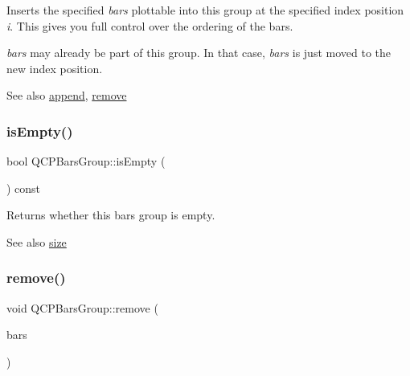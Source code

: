 Inserts the specified {\itshape bars} plottable into this group at the specified index position {\itshape i}. This gives you full control over the ordering of the bars.

{\itshape bars} may already be part of this group. In that case, {\itshape bars} is just moved to the new index position.

\begin{DoxySeeAlso}{See also}
\mbox{\hyperlink{class_q_c_p_bars_group_a809ed63cc4ff7cd5b0b8c96b470163d3}{append}}, \mbox{\hyperlink{class_q_c_p_bars_group_a215e28a5944f1159013a0e19169220e7}{remove}} 
\end{DoxySeeAlso}
\mbox{\label{class_q_c_p_bars_group_aac959e79e852e8ef9aea6e0449ad000a}} 
\subsubsection{\texorpdfstring{is\+Empty()}{isEmpty()}}
{\footnotesize\ttfamily bool Q\+C\+P\+Bars\+Group\+::is\+Empty (\begin{DoxyParamCaption}{ }\end{DoxyParamCaption}) const\hspace{0.3cm}{\ttfamily [inline]}}

Returns whether this bars group is empty.

\begin{DoxySeeAlso}{See also}
\mbox{\hyperlink{class_q_c_p_bars_group_a3780ec77919cb00840207ec7a0f00dd5}{size}} 
\end{DoxySeeAlso}
\mbox{\label{class_q_c_p_bars_group_a215e28a5944f1159013a0e19169220e7}} 
\subsubsection{\texorpdfstring{remove()}{remove()}}
{\footnotesize\ttfamily void Q\+C\+P\+Bars\+Group\+::remove (\begin{DoxyParamCaption}\item[{\mbox{\hyperlink{class_q_c_p_bars}{Q\+C\+P\+Bars}} $\ast$}]{bars }\end{DoxyParamCaption})}

